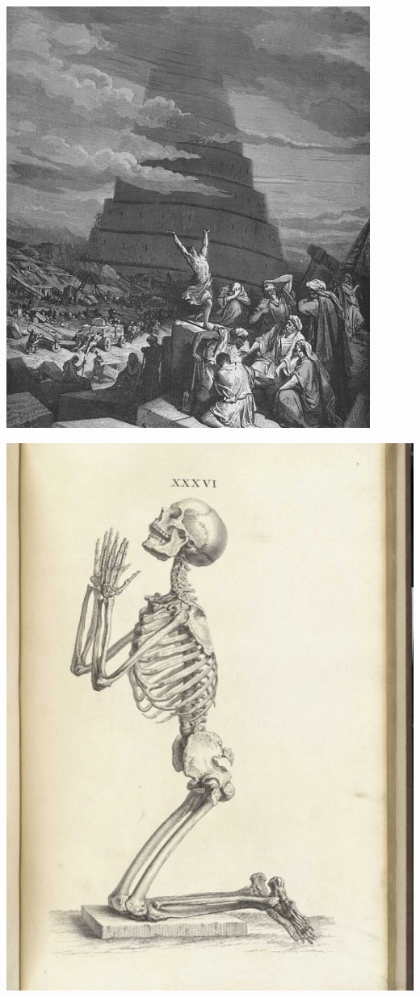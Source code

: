 \documentclass[11pt,compress,professionalfonts]{beamer}
\begin{document}
\newpage 
\centerline{\includegraphics[scale=1]{pictures/confusionoftongues.png}}



\newpage

\centerline{\includegraphics[scale=.7]{pictures/praying-skeleton}}
\end{document}
